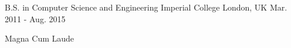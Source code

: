 

\begin{cventries}

  \cventry
    {B.S. in Computer Science and Engineering} %
    {Imperial College} %
    {London, UK} %
    {Mar. 2011 - Aug. 2015} %
    {
      \begin{cvitems} %
        \item {Magna Cum Laude}
      \end{cvitems}
    }

\end{cventries}
